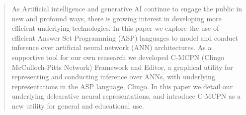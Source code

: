 \documentclass{article}
\begin{document}
\maketitle

\begin{abstract}
  As Artificial intelligence and generative AI continue to engage the public in new and profound ways, there is growing interest in developing more efficient underlying technologies. In this paper we explore the use of efficient Answer Set Programming (ASP) languages to model and conduct inference over artificial neural network (ANN) architectures. As a supportive tool for our own reasearch we developed C-MCPN (Clingo McCulloch-Pitts Network) Framework and Editor, a graphical utility for representing and conducting inference over ANNs, with underlying representations in the ASP language, Clingo. In this paper we detail our underlying delcarative neural representations, and introduce C-MCPN as a new utility for general and educational use.




\end{abstract}
\end{document}
